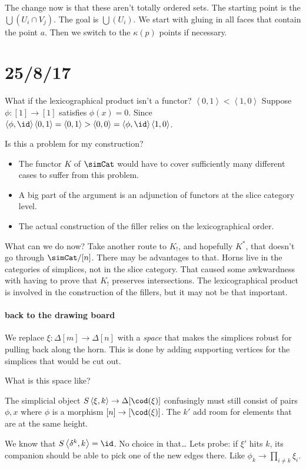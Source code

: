 \documentclass{tac}
\newcommand\of{:}
\newcommand\simplex\Delta
\newcommand\tuplet[1]{\left\langle #1 \right\rangle}
\begin{document}
The change now is that these aren't totally ordered sets. The starting point is the $\bigcup(U_i\cap V_j)$. The goal is $\bigcup(U_i)$. We start with gluing in all faces that contain the point $a$. Then we switch to the $\kappa(p)$ points if necessary.

\section{25/8/17}
What if the lexicographical product isn't a functor?
$\tuplet{0,1} < \tuplet{1,0}$
Suppose $\phi\of[1]\to[1]$ satisfies $\phi(x)=0$.
Since $\tuplet{\phi,\id}\tuplet{0,1}=\tuplet{0,1}>\tuplet{0,0} = \tuplet{\phi,\id}\tuplet{1,0}$.

Is this a problem for my construction?
\begin{itemize}
\item The functor $K$ of $\simCat$ would have to cover sufficiently many different cases to suffer from this problem.
\item A big part of the argument is an adjunction of functors at the slice category level.
\item The actual construction of the filler relies on the lexicographical
order.
\end{itemize}

What can we do now?
Take another route to $K_!$, and hopefully $K^*$, that doesn't go through $\simCat/[n]$.
There may be advantages to that.
Horns live in the categories of simplices, not in the slice category. That caused some awkwardness with having to prove that $K_!$ preserves intersections.
The lexicographical product is involved in the construction of the fillers, but it may not be that important.

\paragraph{back to the drawing board}
We replace $\xi\of\simplex[m]\to\simplex[n]$ with a \emph{space} that makes the simplices robust for pulling back along the horn. This is done
by adding supporting vertices for the simplices that would be cut out.

What is this space like?

The simplicial object $S\tuplet{\xi,k}\to\simplex[\cod(\xi)]$ confusingly must still consist of
pairs ${\phi,x}$ where $\phi$ is a morphism $[n]\to[\cod(\xi)]$. The $k'$ add room for elements that are at the same height.

We know that $S\tuplet{\delta^k,k} = \id$. No choice in that\dots
Lets probe: if $\xi'$ hits $k$, its companion should be able to pick one of the new edges there. Like $\phi_k\to \prod_{i\neq k} \xi_i$.
\end{document}
